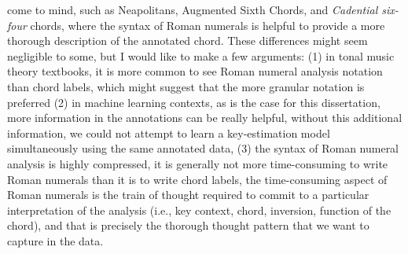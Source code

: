 come to mind, such as Neapolitans, Augmented Sixth Chords,
and \emph{Cadential six-four} chords, where the syntax of
Roman numerals is helpful to provide a more thorough
description of the annotated chord. These differences might
seem negligible to some, but I would like to make a few
arguments: (1) in tonal music theory textbooks, it is more
common to see Roman numeral analysis notation than chord
labels, which might suggest that the more granular notation
is preferred (2) in machine learning contexts, as is the
case for this dissertation, more information in the
annotations can be really helpful, without this additional
information, we could not attempt to learn a key-estimation
model simultaneously using the same annotated data, (3) the
syntax of Roman numeral analysis is highly compressed, it is
generally not more time-consuming to write Roman numerals
than it is to write chord labels, the time-consuming aspect
of Roman numerals is the train of thought required to commit
to a particular interpretation of the analysis (i.e., key
context, chord, inversion, function of the chord), and that
is precisely the thorough thought pattern that we want to
capture in the data.
